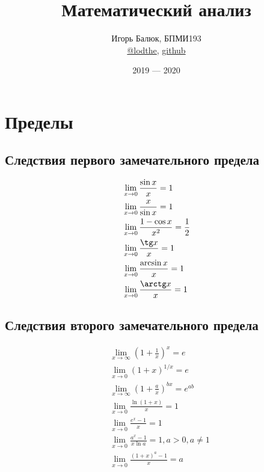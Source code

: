 \documentclass[12pt, a4paper]{article}
\title{Математический анализ}
\author{
	Игорь Балюк, БПМИ193 \\ 
	\href{https://teleg.run/lodthe}{@lodthe}, \href{https://github.com/LoDThe/hse-tex}{github}
}
\date{2019 --- 2020}
\begin{document}
	\maketitle
	\tableofcontents
	\newpage
	\section{Пределы}

	\subsection{Следствия первого замечательного предела}
	\begin{align*}
		&\lim_{x \to 0} \dfrac{\sin x}{x} = 1 \\
		&\lim_{x \to 0} \dfrac{x}{\sin x} = 1 \\
		&\lim_{x \to 0} \dfrac{1 - \cos x}{x^2} = \dfrac{1}{2} \\
		&\lim_{x \to 0} \dfrac{\tg x}{x} = 1 \\
		&\lim_{x \to 0} \dfrac{\arcsin x}{x} = 1 \\
		&\lim_{x \to 0} \dfrac{\arctg x}{x} = 1 \\
	\end{align*}

	\subsection{Следствия второго замечательного предела}
	\begin{align*}
		&\lim_{x \to \infty} \left(1 + \frac{1}{x}\right)^x = e \\
		&\lim_{x \to 0} \left(1 + x\right)^{1/x} = e \\
		&\lim_{x \to \infty} \left(1 + \frac{a}{x}\right)^{bx} = e^{ab} \\
		&\lim_{x \to 0} \frac{\ln (1 + x)}{x} = 1 \\
		&\lim_{x \to 0} \frac{e^x - 1}{x} = 1 \\
		&\lim_{x \to 0} \frac{a^x - 1}{x \ln a} = 1, a > 0, a \neq 1 \\
		&\lim_{x \to 0} \frac{(1 + x)^a - 1}{x} = a
	\end{align*}
\end{document}

